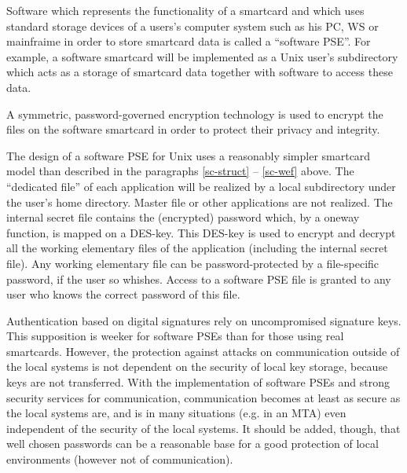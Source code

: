Software which represents the
functionality of a smartcard and which uses
standard storage devices of
a users's computer system such as his PC, WS or mainfraime
in order to store smartcard data
is called a ``software PSE''.
For example,
a software smartcard will be implemented as
a Unix user's subdirectory
which acts as a storage of smartcard data
together with software to access these data.

A symmetric, password-governed encryption technology
is used to encrypt the files on the software smartcard
in order to protect their privacy and integrity.

The design of a software PSE for Unix
uses a reasonably simpler smartcard model than described in the
paragraphs \ref{sc-struct} -- \ref{sc-wef} above.
The ``dedicated file'' of each application will be
realized by a local subdirectory under the user's home directory.
Master file or other applications are not realized.
The internal secret file contains the (encrypted) password
which, by a oneway function, is mapped on a DES-key.
This DES-key is used to encrypt and decrypt all the
working elementary files of the application
(including the internal secret file).
Any working elementary file can be password-protected
by a file-specific password, if the user so whishes.
Access to a software PSE file is granted to any user
who knows the correct password of this file.

Authentication based on digital signatures rely on uncompromised
signature keys. This supposition is weeker for software PSEs
than for those using real smartcards. However, the protection against attacks
on communication outside of the local systems is not dependent
on the security of local key storage,
because keys are not transferred.
With the implementation of software PSEs and
strong security services for communication,
communication becomes at least as secure as the local systems are,
and is in many situations (e.g. in an MTA)
even independent of the security of the local systems.
It should be added, though, that well chosen passwords
can be a reasonable base for a good protection of local environments
(however not of communication).
